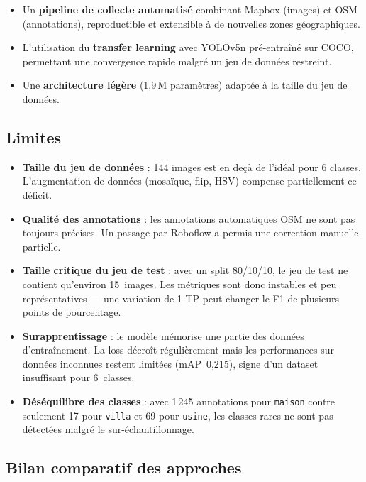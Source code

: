 \documentclass[12pt,a4paper]{article}
\begin{document}
\begin{itemize}
    \item Un \textbf{pipeline de collecte automatisé} combinant Mapbox (images) et OSM (annotations), reproductible et extensible à de nouvelles zones géographiques.
    \item L'utilisation du \textbf{transfer learning} avec YOLOv5n pré-entraîné sur COCO, permettant une convergence rapide malgré un jeu de données restreint.
    \item Une \textbf{architecture légère} (1,9\,M paramètres) adaptée à la taille du jeu de données.
\end{itemize}

\subsection{Limites}

\begin{itemize}
    \item \textbf{Taille du jeu de données} : 144 images est en deçà de l'idéal pour 6 classes. L'augmentation de données (mosaïque, flip, HSV) compense partiellement ce déficit.
    \item \textbf{Qualité des annotations} : les annotations automatiques OSM ne sont pas toujours précises. Un passage par Roboflow a permis une correction manuelle partielle.
    \item \textbf{Taille critique du jeu de test} : avec un split 80/10/10, le jeu de test ne contient qu'environ 15~images. Les métriques sont donc instables et peu représentatives --- une variation de 1 TP peut changer le F1 de plusieurs points de pourcentage.
    \item \textbf{Surapprentissage} : le modèle mémorise une partie des données d'entraînement. La loss décroît régulièrement mais les performances sur données inconnues restent limitées (mAP~0,215), signe d'un dataset insuffisant pour 6~classes.
    \item \textbf{Déséquilibre des classes} : avec 1\,245 annotations pour \texttt{maison} contre seulement 17 pour \texttt{villa} et 69 pour \texttt{usine}, les classes rares ne sont pas détectées malgré le sur-échantillonnage.
\end{itemize}

\subsection{Bilan comparatif des approches}
\end{document}
